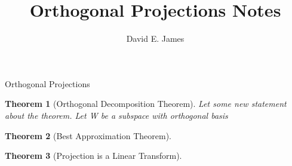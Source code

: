 \documentclass{amsart}
\title{Orthogonal Projections Notes}
\author{David E. James}
\newtheorem*{theorem}{Theorem}
\begin{document}
\maketitle
Orthogonal Projections

\bigskip



\begin{theorem}[Orthogonal Decomposition Theorem]
Let some new statement about the theorem.
Let W be a subspace with orthogonal basis

\end{theorem}




\begin{theorem}[Best Approximation Theorem]

\end{theorem}


\begin{theorem}[Projection is a Linear Transform]

\end{theorem}
\end{document}
